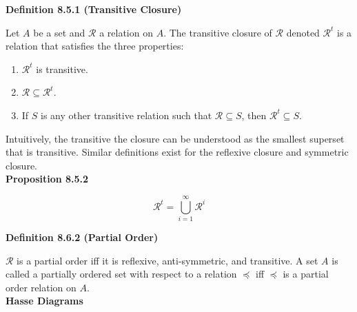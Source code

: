 \documentclass[a4paper]{article}
\newcommand{\subheading}[1]{{\scriptsize\textbf{#1}}}
\begin{document}
\begin{multicols*}{4}
\subheading{Definition 8.5.1 (Transitive Closure)}

Let $A$ be a set and $\mathcal{R}$ a relation on $A$. The transitive closure of
$\mathcal{R}$ denoted $\mathcal{R}^t$ is a relation that satisfies the three
properties:
\begin{enumerate} \itemsep -0.5em
  \item $\mathcal{R}^t$ is transitive.
  \item $\mathcal{R} \subseteq \mathcal{R}^t$.
  \item If $\textit{S}$ is any other transitive relation such that $\mathcal{R}
    \subseteq \textit{S}$, then $\mathcal{R}^t \subseteq \textit{S}$.
\end{enumerate}
Intuitively, the transitive the closure can be understood as the smallest
superset that is transitive. Similar definitions exist for the reflexive closure
and symmetric closure.\\

\subheading{Proposition 8.5.2}

$$\mathcal{R}^t = \bigcup^\infty_{i=1} \mathcal{R}^i$$

\subheading{Definition 8.6.2 (Partial Order)}

$\mathcal{R}$ is a partial order iff it is reflexive, anti-symmetric, and
transitive. A set $A$ is called a partially ordered set with respect to a
relation $\preceq$ iff $\preceq$ is a partial order relation on $A$.\\

\subheading{Hasse Diagrams}


\end{multicols*}
\end{document}
